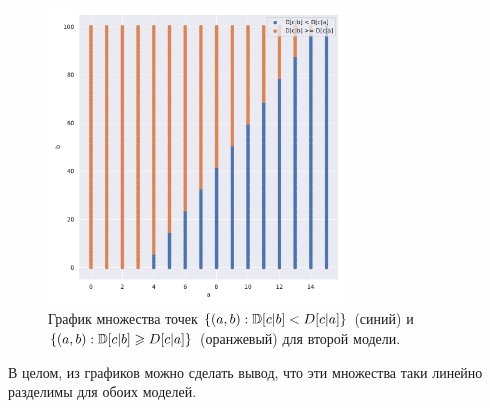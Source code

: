 \begin{figure}[H]
    \centering
    \includegraphics[width=0.7\textwidth]{pics/task4_1.pdf}
    \caption{График множества точек $\{(a, b): \mathbb{D} [c|b] < D[c|a]\}$ (синий) и $\{(a, b): \mathbb{D} [c|b] \geqslant D[c|a]\}$ (оранжевый) для второй модели.}
\end{figure}

В целом, из графиков можно сделать вывод, что эти множества таки линейно разделимы для обоих моделей.
